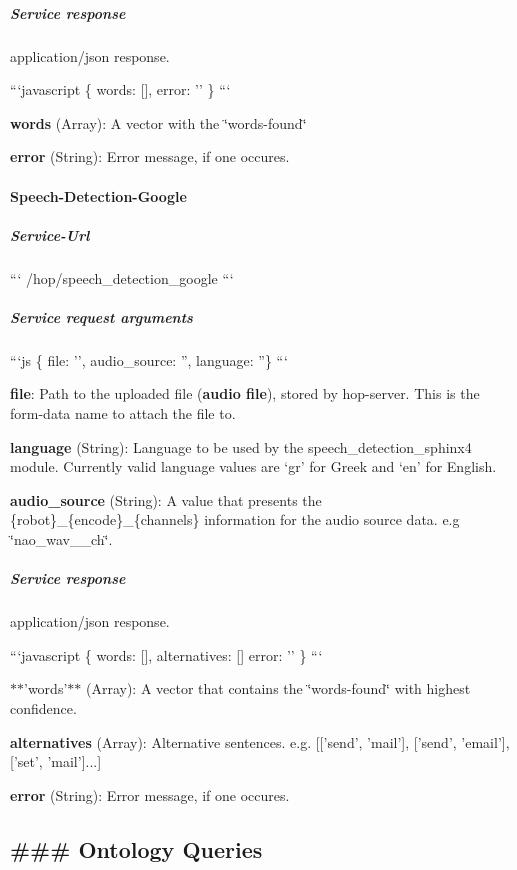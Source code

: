 \subparagraph*{Service response}

application/json response.

```javascript \{ words\-: \mbox{[}\mbox{]}, error\-: '' \} ```


\begin{DoxyItemize}
\item {\bfseries words} (Array)\-: A vector with the \char`\"{}words-\/found\char`\"{}
\item {\bfseries error} (String)\-: Error message, if one occures.
\end{DoxyItemize}

\paragraph*{Speech-\/\-Detection-\/\-Google}

\subparagraph*{Service-\/\-Url}

``` /hop/speech\-\_\-detection\-\_\-google ```

\subparagraph*{Service request arguments}

```js \{ file\-: '', audio\-\_\-source\-: '', language\-: ''\} ```


\begin{DoxyItemize}
\item {\bfseries file}\-: Path to the uploaded file ({\bfseries audio file}), stored by hop-\/server. This is the form-\/data name to attach the file to.
\item {\bfseries language} (String)\-: Language to be used by the speech\-\_\-detection\-\_\-sphinx4 module. Currently valid language values are ‘gr’ for Greek and ‘en’ for English.
\item {\bfseries audio\-\_\-source} (String)\-: A value that presents the \{robot\}\-\_\-\{encode\}\-\_\-\{channels\} information for the audio source data. e.\-g \char`\"{}nao\-\_\-wav\-\_\-\_\-ch\char`\"{}.
\end{DoxyItemize}

\subparagraph*{Service response}

application/json response.

```javascript \{ words\-: \mbox{[}\mbox{]}, alternatives\-: \mbox{[}\mbox{]} error\-: '' \} ```


\begin{DoxyItemize}
\item $\ast$$\ast$'words'$\ast$$\ast$ (Array)\-: A vector that contains the \char`\"{}words-\/found\char`\"{} with highest confidence.
\item {\bfseries alternatives} (Array)\-: Alternative sentences. e.\-g. \mbox{[}\mbox{[}'send', 'mail'\mbox{]}, \mbox{[}'send', 'email'\mbox{]}, \mbox{[}'set', 'mail'\mbox{]}...\mbox{]}
\item {\bfseries error} (String)\-: Error message, if one occures. 

 \subsection*{\#\#\# Ontology Queries }
\end{DoxyItemize}

